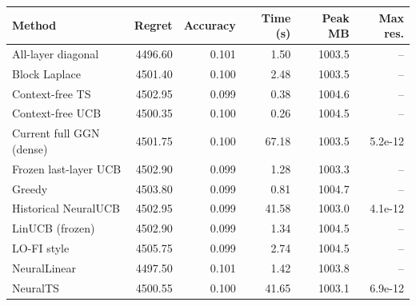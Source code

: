 \begin{tabular}{lrrrrr}
\toprule
Method & Regret & Accuracy & Time (s) & Peak MB & Max res. \\
\midrule
All-layer diagonal & 4496.60 & 0.101 & 1.50 & 1003.5 & -- \\
Block Laplace & 4501.40 & 0.100 & 2.48 & 1003.5 & -- \\
Context-free TS & 4502.95 & 0.099 & 0.38 & 1004.6 & -- \\
Context-free UCB & 4500.35 & 0.100 & 0.26 & 1004.5 & -- \\
Current full GGN (dense) & 4501.75 & 0.100 & 67.18 & 1003.5 & 5.2e-12 \\
Frozen last-layer UCB & 4502.90 & 0.099 & 1.28 & 1003.3 & -- \\
Greedy & 4503.80 & 0.099 & 0.81 & 1004.7 & -- \\
Historical NeuralUCB & 4502.95 & 0.099 & 41.58 & 1003.0 & 4.1e-12 \\
LinUCB (frozen) & 4502.90 & 0.099 & 1.34 & 1004.5 & -- \\
LO-FI style & 4505.75 & 0.099 & 2.74 & 1004.5 & -- \\
NeuralLinear & 4497.50 & 0.101 & 1.42 & 1003.8 & -- \\
NeuralTS & 4500.55 & 0.100 & 41.65 & 1003.1 & 6.9e-12 \\
\bottomrule
\end{tabular}
